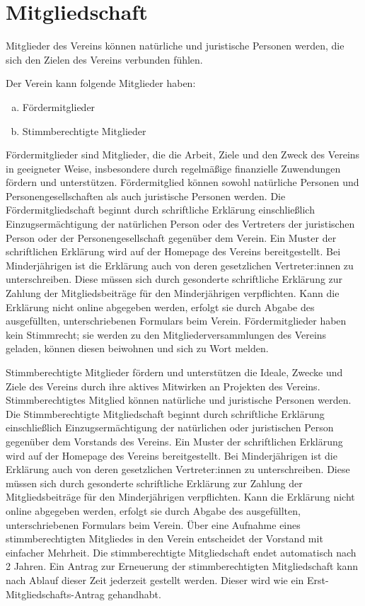 \section{Mitgliedschaft}
\begin{contract}

    Mitglieder des Vereins können natürliche und juristische Personen werden, die sich den Zielen des Vereins verbunden fühlen.

    Der Verein kann folgende Mitglieder haben:
    \begin{enumerate}[(a)]
        \item Fördermitglieder
        \item Stimmberechtigte Mitglieder
    \end{enumerate}


    Fördermitglieder sind Mitglieder, die die Arbeit, Ziele und den Zweck des Vereins in geeigneter Weise, insbesondere durch regelmäßige finanzielle Zuwendungen fördern und unterstützen. Fördermitglied können sowohl natürliche Personen und Personengesellschaften als auch juristische Personen werden. Die Fördermitgliedschaft beginnt durch schriftliche Erklärung einschließlich Einzugsermächtigung der natürlichen Person oder des Vertreters der juristischen Person oder der Personengesellschaft gegenüber dem Verein. Ein Muster der schriftlichen Erklärung wird auf der Homepage des Vereins bereitgestellt. Bei  Minderjährigen ist die Erklärung auch von deren gesetzlichen Vertreter:innen zu unterschreiben. Diese müssen sich durch gesonderte schriftliche Erklärung zur Zahlung der Mitgliedsbeiträge für den Minderjährigen verpflichten. Kann die Erklärung nicht online abgegeben werden, erfolgt sie durch Abgabe des ausgefüllten, unterschriebenen Formulars beim Verein. Fördermitglieder haben kein Stimmrecht; sie werden zu den Mitgliederversammlungen des Vereins geladen, können diesen beiwohnen und sich zu Wort melden.

    Stimmberechtigte Mitglieder fördern und unterstützen die Ideale, Zwecke und Ziele des Vereins durch ihre aktives Mitwirken an Projekten des Vereins. Stimmberechtigtes Mitglied können natürliche und juristische Personen werden. Die Stimmberechtigte Mitgliedschaft beginnt durch schriftliche Erklärung einschließlich Einzugsermächtigung der natürlichen oder juristischen Person gegenüber dem Vorstands des Vereins. Ein Muster der schriftlichen Erklärung wird auf der Homepage des Vereins bereitgestellt. Bei Minderjährigen ist die Erklärung auch von deren gesetzlichen Vertreter:innen zu unterschreiben. Diese müssen sich durch gesonderte schriftliche Erklärung zur Zahlung der Mitgliedsbeiträge für den Minderjährigen verpflichten. Kann die Erklärung nicht online abgegeben werden, erfolgt sie durch Abgabe des ausgefüllten, unterschriebenen Formulars beim Verein. Über eine Aufnahme eines stimmberechtigten Mitgliedes in den Verein entscheidet der Vorstand mit einfacher Mehrheit. Die stimmberechtigte Mitgliedschaft endet automatisch nach 2 Jahren. Ein Antrag zur Erneuerung der stimmberechtigten Mitgliedschaft kann nach Ablauf dieser Zeit jederzeit gestellt werden. Dieser wird wie ein Erst-Mitgliedschafts-Antrag gehandhabt.


\end{contract}
